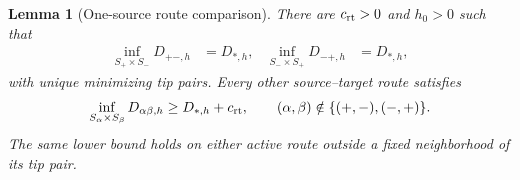 \documentclass[11pt]{article}
\newtheorem{lemma}[theorem]{Lemma}
\begin{document}
\begin{lemma}[One-source route comparison]\label{lem:route-ledger}
There are $c_{\rm rt}>0$ and $h_0>0$ such that
\begin{align}
 \inf_{S_+\times S_-}D_{+-,h}
 &=D_{*,h},
 &
 \inf_{S_-\times S_+}D_{-+,h}
 &=D_{*,h},
 \label{eq:active-route-min}
\end{align}
with unique minimizing tip pairs.  Every other source--target route satisfies
\begin{equation}\label{eq:inactive-route-gap}
 \inf_{S_\alpha\times S_\beta}D_{\alpha\beta,h}
 \ge D_{*,h}+c_{\rm rt},
 \qquad
 (\alpha,\beta)\notin\{(+,-),(-,+)\}.
\end{equation}
The same lower bound holds on either active route outside a fixed neighborhood
of its tip pair.
\end{lemma}
\end{document}
